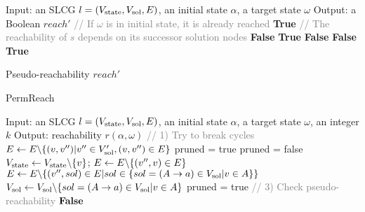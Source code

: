 \begin{algorithm}[ht]
\begin{algorithmic}
    \State Input: an SLCG $l=(V_{\mathrm{state}}, {V_\mathrm{sol}},E)$, an initial state $\alpha$, a target state $\omega$
    \State Output: a Boolean $reach'$
    \State \textcolor{gray}{// If $\omega$ is in initial state, it is already reached}
    \If {$\omega\in \alpha$}
       \State\Return \textbf{True}
    \EndIf
    \State \textcolor{gray}{// The reachability of $s$ depends on its successor solution nodes}
        \State\Return \textbf{False}
    \EndIf
            \State\Return \textbf{True}
        \EndIf
    \EndFor
    \State\Return \textbf{False}
    \EndProcedure
            \State\Return \textbf{False}
        \EndIf
    \EndFor
    \State\Return \textbf{True}
    \EndProcedure
\end{algorithmic}
\caption{Pseudo-reachability $reach'$}\label{algPseudo}
\end{algorithm}

\begin{algorithm}\caption{PermReach}\label{alg:perm}
\begin{algorithmic}
    \State Input: an SLCG $l=(V_{\mathrm{state}},V_{\mathrm{sol}}, E)$, an initial state $\alpha$, a target state $\omega$, an integer $k$
    \State Output: reachability $r(\alpha,\omega)$
    \State \textcolor{gray}{// 1) Try to break cycles}%
                    \State $E\gets E\miset{(v,v'')|v''\in V'_\sol,(v,v'')\in E}$
                \EndIf
            \EndFor
        \EndIf
    \EndFor %
    \State{\textcolor{gray}{// 2) Remove useless nodes/edges}} %
    \State pruned = true
        \State pruned = false
                \State $V_\st \gets V_\st\miset{v}$; $E\gets E\miset{(v'',v)\in E}$
                \State $E\gets E\miset{ (v'',sol)\in E | sol \in \{sol = (A \rightarrow a) \in V_\sol | v \in A}\}$
                \State $V_\sol \gets V_\sol\miset{sol = (A \rightarrow a) \in V_\sol | v \in A}$
                \State pruned = true
            \EndIf
        \EndFor %
    \EndWhile
    \State \textcolor{gray}{// 3) Check pseudo-reachability} %
        \State \Return $\mathbf{False}$
    \EndIf %

\end{algorithmic}
\end{algorithm}

